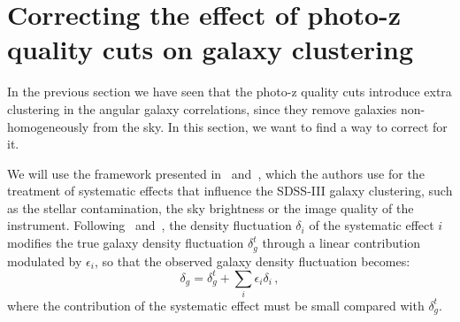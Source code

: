 \section{Correcting the effect of photo-z quality cuts on galaxy clustering}
\label{sec:correction}

In the previous section we have seen that the photo-z quality cuts introduce extra clustering in the angular galaxy correlations, since they remove galaxies non-homogeneously from the sky. In this section, we want to find a way to correct for it.

We will use the framework presented in~\citet{Ho2012} and~\citet{Ross2011}, which the authors use for the treatment of systematic effects that influence the SDSS-III galaxy clustering, such as the stellar contamination, the sky brightness or the image quality of the instrument. 
Following~\citet{Ho2012} and~\citet{Ross2011}, the density fluctuation $\delta_i$ of the systematic effect $i$ modifies the true galaxy density fluctuation $\delta^t_g$ through a linear contribution modulated by $\epsilon_i$, so that the observed galaxy density fluctuation becomes:
\begin{equation}
\delta_g = \delta^t_g+\sum_{i}\epsilon_i \delta_i \label{delta_g_obs} \, ,
\end{equation}
where the contribution of the systematic effect must be small compared with $\delta^t_g$.

